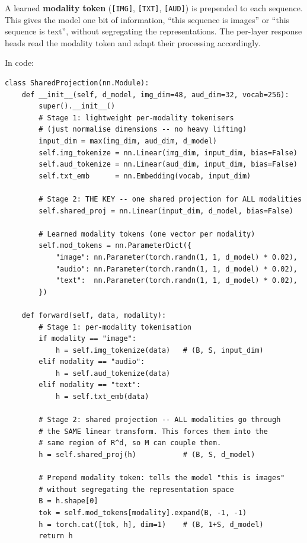 \documentclass[11pt, a4paper]{article}
\theoremstyle{remark}
\begin{document}
A learned \textbf{modality token} (\texttt{[IMG]}, \texttt{[TXT]}, \texttt{[AUD]}) is prepended to each sequence.
This gives the model one bit of information, ``this sequence is images'' or ``this sequence is text'', without segregating the representations.
The per-layer response heads read the modality token and adapt their processing accordingly.

In code:

\begin{lstlisting}[caption={Shared projection with modality tokens: all modalities enter the same space.}]
class SharedProjection(nn.Module):
    def __init__(self, d_model, img_dim=48, aud_dim=32, vocab=256):
        super().__init__()
        # Stage 1: lightweight per-modality tokenisers
        # (just normalise dimensions -- no heavy lifting)
        input_dim = max(img_dim, aud_dim, d_model)
        self.img_tokenize = nn.Linear(img_dim, input_dim, bias=False)
        self.aud_tokenize = nn.Linear(aud_dim, input_dim, bias=False)
        self.txt_emb      = nn.Embedding(vocab, input_dim)

        # Stage 2: THE KEY -- one shared projection for ALL modalities
        self.shared_proj = nn.Linear(input_dim, d_model, bias=False)

        # Learned modality tokens (one vector per modality)
        self.mod_tokens = nn.ParameterDict({
            "image": nn.Parameter(torch.randn(1, 1, d_model) * 0.02),
            "audio": nn.Parameter(torch.randn(1, 1, d_model) * 0.02),
            "text":  nn.Parameter(torch.randn(1, 1, d_model) * 0.02),
        })

    def forward(self, data, modality):
        # Stage 1: per-modality tokenisation
        if modality == "image":
            h = self.img_tokenize(data)   # (B, S, input_dim)
        elif modality == "audio":
            h = self.aud_tokenize(data)
        elif modality == "text":
            h = self.txt_emb(data)

        # Stage 2: shared projection -- ALL modalities go through
        # the SAME linear transform. This forces them into the
        # same region of R^d, so M can couple them.
        h = self.shared_proj(h)           # (B, S, d_model)

        # Prepend modality token: tells the model "this is images"
        # without segregating the representation space
        B = h.shape[0]
        tok = self.mod_tokens[modality].expand(B, -1, -1)
        h = torch.cat([tok, h], dim=1)    # (B, 1+S, d_model)
        return h
\end{lstlisting}
\end{document}
